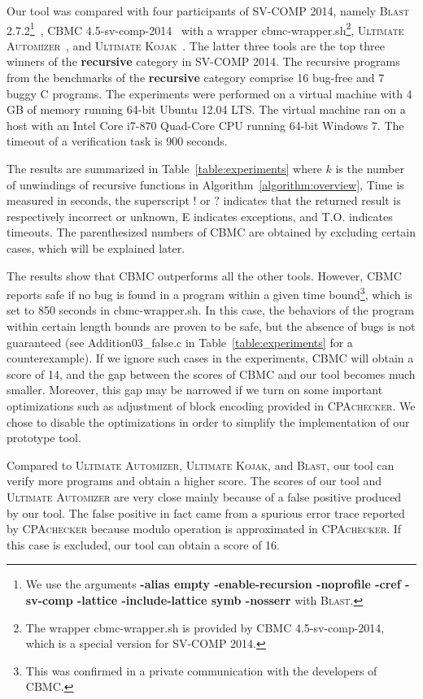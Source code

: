 Our tool was compared with four participants of
SV-COMP 2014, namely \textsc{Blast} 2.7.2\footnote{We use the
  arguments \textbf{-alias empty -enable-recursion -noprofile -cref
    -sv-comp -lattice -include-lattice symb -nosserr} with
  \textsc{Blast}.}~\cite{BeyerHJM07},
CBMC 4.5-sv-comp-2014~\cite{ClarkeKL04} with a wrapper
cbmc-wrapper.sh\footnote{The wrapper cbmc-wrapper.sh is provided by
  CBMC 4.5-sv-comp-2014, which is a special version for SV-COMP
  2014.}, \textsc{Ultimate Automizer}~\cite{HeizmannCDEHLNSP13}, and \textsc{Ultimate
Kojak}~\cite{ErmisNDHP14}.
The latter three tools are the top three winners of the
\textbf{recursive} category in SV-COMP 2014.
The recursive programs from the benchmarks of the \textbf{recursive}
category comprise 16 bug-free and 7 buggy C programs.
The experiments were performed on a virtual machine with 4 GB of memory
running 64-bit Ubuntu 12.04 LTS. 
The virtual machine ran on a host with an Intel Core i7-870 Quad-Core
CPU running 64-bit Windows 7.
The timeout of a verification task is 900 seconds.

The results are summarized in
Table~\ref{table:experiments} where $k$ is the number of unwindings of
recursive functions in Algorithm~\ref{algorithm:overview}, Time is
measured in seconds, the superscript $!$ or $?$ indicates that the
returned result is respectively incorrect or unknown, E indicates
exceptions, and T.O. indicates timeouts.
The parenthesized numbers of CBMC are obtained by excluding
certain cases, which will be explained later.

The results show that CBMC outperforms all the other tools.
However, CBMC reports safe if no bug is found in a program within a
given time bound\footnote{This was confirmed in a private
  communication with the developers of CBMC.}, which is set to 850
seconds in cbmc-wrapper.sh.
In this case, the behaviors of the program within certain length
bounds are proven to be safe, but the absence of bugs is not
guaranteed (see Addition03\_false.c in Table~\ref{table:experiments} for
a counterexample).
If we ignore such cases in the experiments, CBMC will obtain a score
of 14, and the gap between the scores of CBMC and our tool becomes
much smaller.
Moreover, this gap may be narrowed if we turn on some important
optimizations such as adjustment of block encoding provided in
\textsc{CPAchecker}.
We chose to disable the optimizations in order to simplify the
implementation of our prototype tool.

Compared to \textsc{Ultimate Automizer}, \textsc{Ultimate Kojak}, and \textsc{Blast},
our tool can verify more programs and obtain a higher score.
The scores of our tool and \textsc{Ultimate Automizer} are very close mainly
because of a false positive produced by our tool.
The false positive in fact came from a spurious error trace reported
by \textsc{CPAchecker} because modulo operation is approximated in
\textsc{CPAchecker}.
If this case is excluded, our tool can obtain a score of 16.

